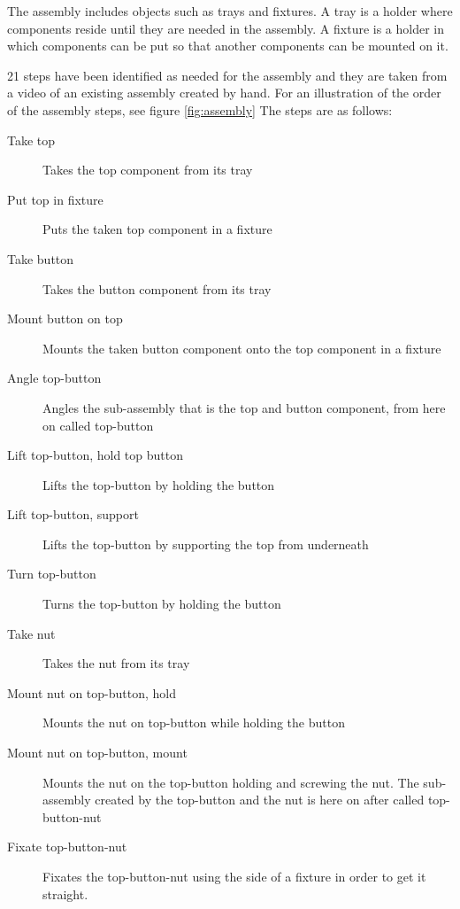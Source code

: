 The assembly includes objects such as trays and fixtures. A tray is a holder where components reside until they are needed in the assembly. A fixture is a holder in which components can be put so that another components can be mounted on it.

21 steps have been identified as needed for the assembly and they are taken from a video of an existing assembly created by hand. For an illustration of the order of the assembly steps, see figure \ref{fig:assembly} The steps are as follows:

\begin{description}
\item[Take top] Takes the top component from its tray

\item[Put top in fixture] Puts the taken top component in a fixture

\item[Take button] Takes the button component from its tray

\item[Mount button on top] Mounts the taken button component onto the top component in a fixture

\item[Angle top-button] Angles the sub-assembly that is the top and button component, from here on called top-button

\item[Lift top-button, hold top button] Lifts the top-button by holding the button

\item[Lift top-button, support] Lifts the top-button by supporting the top from underneath

\item[Turn top-button] Turns the top-button by holding the button

\item[Take nut] Takes the nut from its tray

\item[Mount nut on top-button, hold] Mounts the nut on top-button while holding the button

\item[Mount nut on top-button, mount] Mounts the nut on the top-button holding and screwing the nut. The sub-assembly created by the top-button and the nut is here on after called top-button-nut

\item[Fixate top-button-nut] Fixates the top-button-nut using the side of a fixture in order to get it straight.


\end{description}
